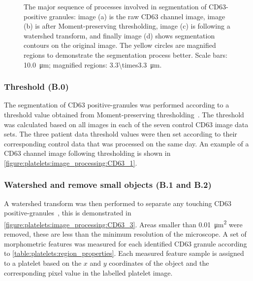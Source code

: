 \begin{figure}[htbp]
\begin{subfigure}[b]{0.45\linewidth}
		\caption{}
		\label{figure:platelets:image_processing:CD63_4}
		\vspace{1ex}
	\end{subfigure}
	\caption[CD63 positive-granule segmentation]{The major sequence of processes involved in segmentation of CD63-positive granules: image (a) is the raw CD63 channel image, image (b) is after Moment-preserving thresholding, image (c) is following a watershed transform, and finally image (d) shows segmentation contours on the original image. The yellow circles are magnified regions to demonstrate the segmentation process better. Scale bars: \SI{10.0}{\micro\meter}; magnified regions: \SI{3.3\times3.3}{\micro\meter}.}
	\label{figure:image_processing:granules}
\end{figure}

\subsubsection{Threshold (B.0)}
The segmentation of CD63 positive-granules was performed according to a threshold value obtained from Moment-preserving thresholding~\cite{Tsai1985}. The threshold was calculated based on all images in each of the seven control CD63 image data sets. The three patient data threshold values were then set according to their corresponding control data that was processed on the same day. An example of a CD63 channel image following thresholding is shown in \autoref{figure:platelets:image_processing:CD63_1}.

\subsubsection{Watershed and remove small objects (B.1 and B.2)}
A watershed transform was then performed to separate any touching CD63 positive-granules~\cite{Vincent1991}, this is demonstrated in \autoref{figure:platelets:image_processing:CD63_3}. Areas smaller than \SI{0.01}{\micro\meter\squared} were removed, these are less than the minimum resolution of the microscope. A set of morphometric features was measured for each identified CD63 granule according to \autoref{table:platelets:region_properties}. Each measured feature sample is assigned to a platelet based on the $x$ and $y$ coordinates of the object and the corresponding pixel value in the labelled platelet image.

